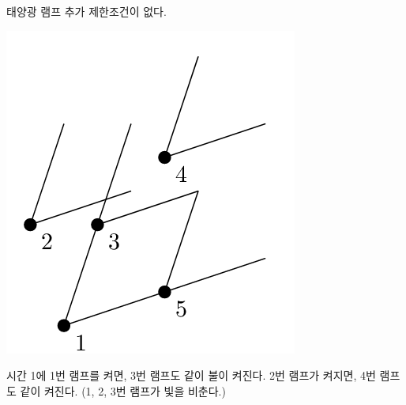 \begin{problem}{태양광 램프}
	추가 제한조건이 없다.
	
	\Examples
		
	\begin{example}
	\end{example}
	
	\Note
	
	\includegraphics[]{lam.png}
	
	시간 1에 1번 램프를 켜면, 3번 램프도 같이 불이 켜진다. 2번 램프가 켜지면, 4번 램프도 같이 켜진다. (1, 2, 3번 램프가 빛을 비춘다.)
	
\end{problem}

